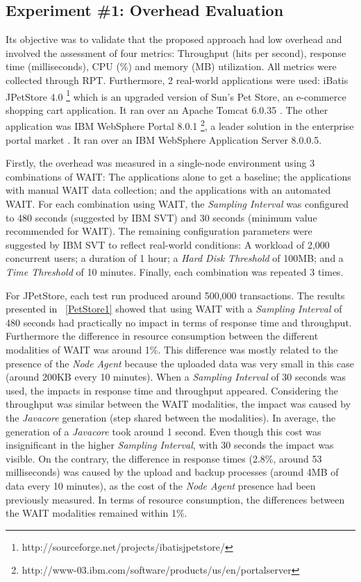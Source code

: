\documentclass[runningheads,a4paper]{llncs}
\begin{document}
\subsection{Experiment \#1: Overhead Evaluation}
\vspace{-2pt}

Its objective was to validate that the proposed approach had low overhead and
involved the assessment of four metrics: Throughput (hits per second), response
time (milliseconds), CPU (\%) and memory (MB) utilization. All metrics were
collected through RPT. Furthermore, 2 real-world applications were used: iBatis JPetStore
4.0 \footnote{http://sourceforge.net/projects/ibatisjpetstore/} which is an upgraded
version of Sun's Pet Store, an e-commerce shopping cart application. It ran over
an Apache Tomcat 6.0.35
. The other application was IBM
WebSphere Portal 
8.0.1 \footnote{http://www-03.ibm.com/software/products/us/en/portalserver},
a leader solution in the enterprise portal market \cite{Gartner2008}. It ran
over an IBM WebSphere Application Server 8.0.0.5.

Firstly, the overhead was measured in a single-node environment using 3
combinations of WAIT: The applications alone to get a baseline; the applications
with manual WAIT data collection; and the applications with an automated WAIT.
For each combination using WAIT, the \emph{Sampling Interval} was configured
to 480 seconds (suggested by IBM SVT) and 30 seconds (minimum value recommended for
WAIT). The remaining configuration parameters were suggested by IBM SVT to
reflect real-world conditions: A workload of 2,000 concurrent users; a duration
of 1 hour; a \emph{Hard Disk Threshold} of 100MB; and a \emph{Time Threshold} of
10 minutes. Finally, each combination was repeated 3 times.

For JPetStore, each test run produced around 500,000 transactions. The results
presented in \tablename ~\ref{PetStore1} showed that using WAIT with a
\emph{Sampling Interval} of 480 seconds had practically no impact in terms of
response time and throughput. Furthermore the difference in resource consumption
between the different modalities of WAIT was around 1\%.  This difference was
mostly related to the presence of the \emph{Node Agent} because the uploaded
data was very small in this case (around 200KB every 10 minutes). When a
\emph{Sampling Interval} of 30 seconds was used, the impacts in response time
and throughput appeared. Considering the throughput was similar between the WAIT
modalities, the impact was caused by the \emph{Javacore} generation (step shared
between the modalities). In average, the generation of a \emph{Javacore} took
around 1 second. Even though this cost was insignificant in the higher
\emph{Sampling Interval}, with 30 seconds the impact was visible. On the
contrary, the difference in response times (2.8\%, around 53 milliseconds) was
caused by the upload and backup processes (around 4MB of data every 10 minutes),
as the cost of the \emph{Node Agent} presence had been previously measured. In
terms of resource consumption, the differences between the WAIT modalities
remained within 1\%.
\end{document}
